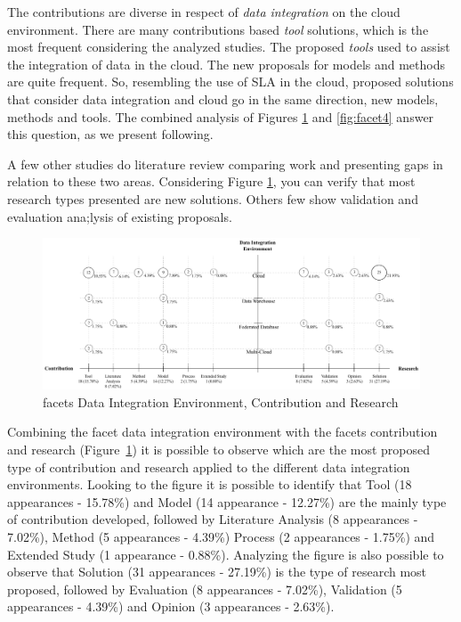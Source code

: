 The contributions are diverse in respect of \textit{data integration} on the
cloud environment. There are many contributions based \textit{tool} solutions,
which is the most frequent considering the analyzed studies. The
proposed \textit{tools} used to assist the integration of data in the cloud.
The new proposals for models and methods are quite frequent. So, resembling the
use of SLA in the cloud, proposed solutions that consider data integration and
cloud go in the same direction, new models, methods and tools. The combined
analysis of Figures \ref{fig:facet2} and \ref{fig:facet4} answer this question,
as we present following.


A few other studies do literature review comparing work and presenting
gaps in relation to these two areas. Considering Figure \ref{fig:facet2}, you
can verify that most research types presented are new solutions. Others few show validation
and evaluation ana;lysis of existing proposals.     

\begin{figure}[h]
\centering
\includegraphics[scale=0.48]{figs/bubble-charts/DI-Environment-Contribution-Research.pdf}
\caption{facets Data Integration Environment, Contribution and Research}\label{fig:facet2}
\end{figure}

Combining the facet data integration environment with the facets contribution and research 
(Figure~\ref{fig:facet2}) it is possible to observe which are the most proposed type of
contribution and research applied to the different data integration environments.  
Looking to the figure it is possible to identify that Tool (18 appearances - 15.78\%) and 
Model (14 appearance - 12.27\%) are the mainly type of contribution developed, 
followed by Literature Analysis (8 appearances - 7.02\%), Method (5 appearances - 4.39\%) 
Process (2 appearances - 1.75\%) and Extended Study (1 appearance - 0.88\%).
Analyzing the figure is also possible to observe that Solution (31 appearances - 27.19\%) is 
the type of research most proposed, followed by Evaluation (8 appearances -
7.02\%), Validation (5 appearances - 4.39\%) and Opinion (3 appearances - 2.63\%).




